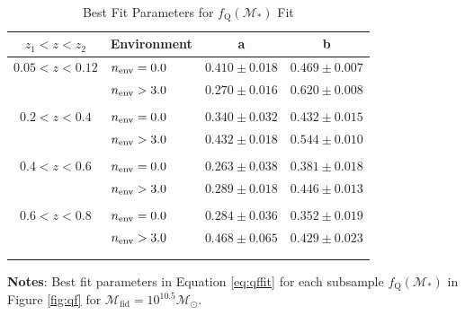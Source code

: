 \begin{table} 
  \caption{Best Fit Parameters for $f_{\mathrm{Q}}(\mathcal{M}_{*})$ Fit}
  \label{tab:bestfitparam}
  \begin{center}
    \leavevmode
    \begin{tabular}{clcc} \hline \hline              
    $z_1 < z < z_2$ &Environment        &a  &b  \\ \hline 
$0.05 < z< 0.12$ &$n_{\mathrm{env}} = 0.0$ & $0.410 \pm 0.018$ & $0.469 \pm 0.007$ \\
               &$n_{\mathrm{env}} > 3.0$ & $0.270 \pm 0.016$ & $0.620 \pm 0.008$ \\ 
                              &               &                       &                           \\ \hline   
$0.2 < z <0.4$ & $n_{\mathrm{env}} = 0.0$ & $0.340 \pm 0.032$ & $0.432 \pm 0.015$ \\
               &$n_{\mathrm{env}} > 3.0$ & $0.432 \pm 0.018$ & $0.544 \pm 0.010$ \\
               &               &                       &                           \\ \hline
$0.4 < z < 0.6$      &$n_{\mathrm{env}} = 0.0$ & $0.263 \pm 0.038$ & $0.381 \pm 0.018$ \\
               &$n_{\mathrm{env}} > 3.0$ & $0.289 \pm 0.018$ & $0.446 \pm 0.013$ \\
               &               &                       &                           \\ \hline
$0.6 < z < 0.8$      &$n_{\mathrm{env}} = 0.0$ & $0.284 \pm 0.036$ & $0.352 \pm 0.019$ \\
               &$n_{\mathrm{env}} > 3.0$            & $0.468 \pm 0.065$ & $0.429 \pm 0.023$ \\
               &               &                       &                           \\ \hline
  \multicolumn{4}{l}{}                                             \\       
    \end{tabular} \par
    \end{center}
    {\bf Notes}: Best fit parameters in Equation \ref{eq:qffit} for each subsample $f_{\mathrm{Q}}(\mathcal{M}_{*})$ in Figure \ref{fig:qf} for $\mathcal{M}_{\mathrm{fid}} = 10^{10.5} \mathcal{M}_{\odot}$.
\end{table}

